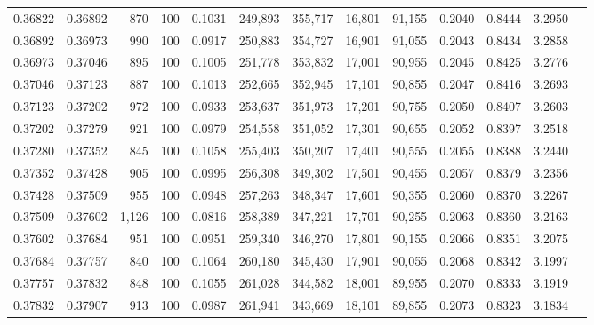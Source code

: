 \begin{tabular}{rrrrrrrrrrrrr}
0.36822 & 0.36892 &   870 & 100 &                                     0.1031 & 249,893 & 355,717 &  16,801 &  91,155 & 0.2040 & 0.8444 & 3.2950 \\
0.36892 & 0.36973 &   990 & 100 &                                     0.0917 & 250,883 & 354,727 &  16,901 &  91,055 & 0.2043 & 0.8434 & 3.2858 \\
0.36973 & 0.37046 &   895 & 100 &                                     0.1005 & 251,778 & 353,832 &  17,001 &  90,955 & 0.2045 & 0.8425 & 3.2776 \\
0.37046 & 0.37123 &   887 & 100 &                                     0.1013 & 252,665 & 352,945 &  17,101 &  90,855 & 0.2047 & 0.8416 & 3.2693 \\
0.37123 & 0.37202 &   972 & 100 &                                     0.0933 & 253,637 & 351,973 &  17,201 &  90,755 & 0.2050 & 0.8407 & 3.2603 \\
0.37202 & 0.37279 &   921 & 100 &                                     0.0979 & 254,558 & 351,052 &  17,301 &  90,655 & 0.2052 & 0.8397 & 3.2518 \\
0.37280 & 0.37352 &   845 & 100 &                                     0.1058 & 255,403 & 350,207 &  17,401 &  90,555 & 0.2055 & 0.8388 & 3.2440 \\
0.37352 & 0.37428 &   905 & 100 &                                     0.0995 & 256,308 & 349,302 &  17,501 &  90,455 & 0.2057 & 0.8379 & 3.2356 \\
0.37428 & 0.37509 &   955 & 100 &                                     0.0948 & 257,263 & 348,347 &  17,601 &  90,355 & 0.2060 & 0.8370 & 3.2267 \\
0.37509 & 0.37602 & 1,126 & 100 &                                     0.0816 & 258,389 & 347,221 &  17,701 &  90,255 & 0.2063 & 0.8360 & 3.2163 \\
0.37602 & 0.37684 &   951 & 100 &                                     0.0951 & 259,340 & 346,270 &  17,801 &  90,155 & 0.2066 & 0.8351 & 3.2075 \\
0.37684 & 0.37757 &   840 & 100 &                                     0.1064 & 260,180 & 345,430 &  17,901 &  90,055 & 0.2068 & 0.8342 & 3.1997 \\
0.37757 & 0.37832 &   848 & 100 &                                     0.1055 & 261,028 & 344,582 &  18,001 &  89,955 & 0.2070 & 0.8333 & 3.1919 \\
0.37832 & 0.37907 &   913 & 100 &                                     0.0987 & 261,941 & 343,669 &  18,101 &  89,855 & 0.2073 & 0.8323 & 3.1834 \\

\end{tabular}
